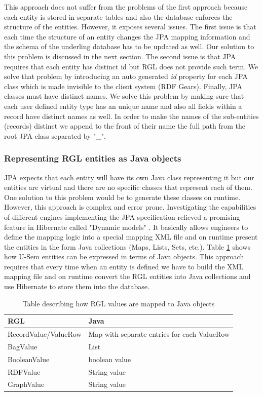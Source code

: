 This approach does not suffer from the problems of the first approach because each entity is stored in separate tables and also the database enforces the structure of the entities. However, it exposes several issues. The first issue is that each time the structure of an entity changes the JPA mapping information and the schema of the underling database has to be updated as well. Our solution to this problem is discussed in the next section. The second issue is that JPA requires that each entity has distinct id but RGL does not provide such term. We solve that problem by introducing an auto generated \textit{id} property for each JPA class which is made invisible to the client system (RDF Gears). Finally, JPA classes must have distinct names. We solve this problem by making sure that each user defined entity type has an unique name and also all fields within a record have distinct names as well. In order to make the names of the sub-entities (records) distinct we append to the front of their name the full path from the root JPA class separated by "\_".


\subsubsection{Representing RGL entities as Java objects}

JPA expects that each entity will have its own Java class representing it but our entities are virtual and there are no specific  classes that represent each of them. One solution to this problem would be to generate these classes on runtime. However, this approach is complex and error prone. Investigating the capabilities of different engines implementing the JPA specification relieved a promising feature in Hibernate called "Dynamic models" \cite{king2010hibernate}. It basically allows engineers to define the mapping logic into a special mapping XML file and on runtime present the entities in the form Java collections (Maps, Lists, Sets, etc.). Table \ref{tbl:rgl2java} shows how U-Sem entities can be expressed in terms of Java objects. This approach requires that every time when an entity is defined we have to build the XML mapping file and on runtime convert the RGL entities into Java collections and use Hibernate to store them into the database.

\begin{table}[h]
    \begin{tabular}{ | l | l |}
    \hline
    \textbf{RGL} & \textbf{Java}  \\ \hline
    RecordValue/ValueRow & Map with separate entries for each ValueRow \\ \hline
    BagValue & List  \\ \hline
    BooleanValue & boolean value  \\ \hline
    RDFValue & String value  \\ \hline
	GraphValue & String  value \\ \hline

    \end{tabular}
     \caption{Table describing how RGL values are mapped to Java objects}
    \label{tbl:rgl2java}
\end{table}
 
